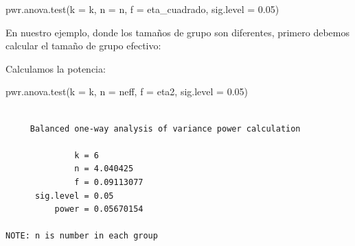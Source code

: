 \documentclass[
  spanish,
  a4paper,
]{scrbook}
\newenvironment{Shaded}{\begin{snugshade}}{\end{snugshade}}
\newcommand{\AttributeTok}[1]{\textcolor[rgb]{0.40,0.45,0.13}{#1}}
\newcommand{\CommentTok}[1]{\textcolor[rgb]{0.37,0.37,0.37}{#1}}
\newcommand{\DecValTok}[1]{\textcolor[rgb]{0.68,0.00,0.00}{#1}}
\newcommand{\FloatTok}[1]{\textcolor[rgb]{0.68,0.00,0.00}{#1}}
\newcommand{\FunctionTok}[1]{\textcolor[rgb]{0.28,0.35,0.67}{#1}}
\newcommand{\NormalTok}[1]{\textcolor[rgb]{0.00,0.23,0.31}{#1}}
\newcommand{\OtherTok}[1]{\textcolor[rgb]{0.00,0.23,0.31}{#1}}
\newcommand{\SpecialCharTok}[1]{\textcolor[rgb]{0.37,0.37,0.37}{#1}}
\begin{document}
\begin{Shaded}
\begin{Highlighting}[]
\FunctionTok{pwr.anova.test}\NormalTok{(}\AttributeTok{k =}\NormalTok{ k, }\AttributeTok{n =}\NormalTok{ n, }\AttributeTok{f =}\NormalTok{ eta\_cuadrado, }\AttributeTok{sig.level =} \FloatTok{0.05}\NormalTok{)}
\end{Highlighting}
\end{Shaded}

En nuestro ejemplo, donde los tamaños de grupo son diferentes, primero
debemos calcular el tamaño de grupo efectivo:

\begin{Shaded}
\end{Shaded}

Calculamos la potencia:

\begin{Shaded}
\begin{Highlighting}[]
\FunctionTok{pwr.anova.test}\NormalTok{(}\AttributeTok{k =}\NormalTok{ k, }\AttributeTok{n =}\NormalTok{ neff, }\AttributeTok{f =}\NormalTok{ eta2, }\AttributeTok{sig.level =} \FloatTok{0.05}\NormalTok{)}
\end{Highlighting}
\end{Shaded}

\begin{verbatim}

     Balanced one-way analysis of variance power calculation 

              k = 6
              n = 4.040425
              f = 0.09113077
      sig.level = 0.05
          power = 0.05670154

NOTE: n is number in each group
\end{verbatim}
\end{document}
